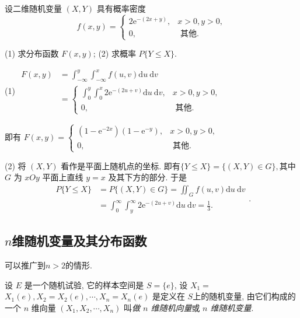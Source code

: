   \begin{example}
    设二维随机变量 $(X, Y)$ 具有概率密度
    $$
        f(x, y)= \begin{cases}2 \mathrm{e}^{-(2 x+y)}, & x>0, y>0, \\ 0, & \text { 其他. }\end{cases}
    $$

    (1) 求分布函数 $F(x, y)$; (2) 求概率 $P\{Y \leqslant X\}$.
  \end{example}
  \begin{solution}
    (1) $\begin{aligned} F(x, y) & =\int_{-\infty}^y \int_{-\infty}^x f(u, v) \mathrm{d} u \mathrm{~d} v \\ & = \begin{cases}\int_0^y \int_0^x 2 \mathrm{e}^{-(2 u+v)} \mathrm{d} u \mathrm{~d} v, & x>0, y>0, \\ 0, & \text { 其他. }\end{cases} \end{aligned}$

            即有 $F(x, y)= \begin{cases}\left(1-\mathrm{e}^{-2 x}\right)\left(1-\mathrm{e}^{-y}\right), & x>0, y>0, \\ 0, & \text { 其他. }\end{cases}$

            (2) 将 $(X, Y)$ 看作是平面上随机点的坐标. 即有$\{Y \leqslant X\}=\{(X, Y) \in G\},$其中 $G$ 为 $x O y$ 平面上直线 $y=x$ 及其下方的部分. 于是
                    $$\begin{aligned} P\{Y \leqslant X\} & =P\{(X, Y) \in G\}=\iint_G f(u, v) \mathrm{d} u \mathrm{~d} v \\ & =\int_0^{\infty} \int_y^{\infty} 2 \mathrm{e}^{-(2 u+v)} \mathrm{d} u \mathrm{~d} v=\frac{1}{3} . \quad \end{aligned}.$$
  \end{solution}
  \subsection{$n$维随机变量及其分布函数}
  可以推广到$n>2$的情形.
    \begin{definition}
        设 $E$ 是一个随机试验, 它的样本空间是 $S=\{e\}$, 设 $X_1=$ $X_1(e), X_2=X_2(e), \cdots, X_n=X_n(e)$ 是定义在 $S$上的随机变量, 由它们构成的一个 $n$ 维向量 $\left(X_1, X_2, \cdots, X_n\right)$ 叫\emph{做 $n$ 维随机向量}或 \emph{$n$ 维随机变量}.
    \end{definition}

